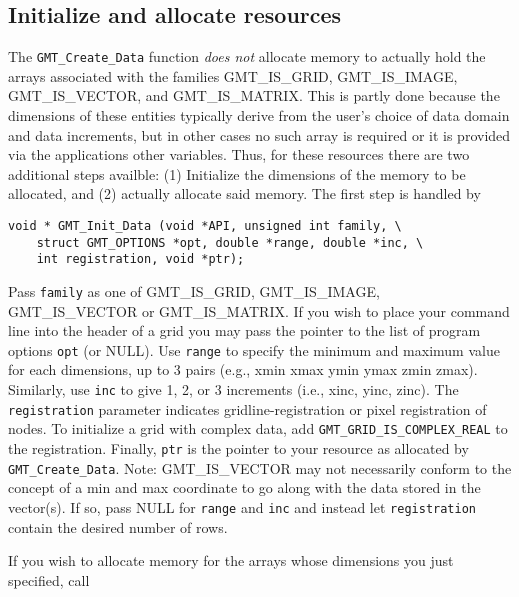 \documentclass[11pt]{report}
\begin{document}

\subsection{Initialize and allocate resources}

The \texttt{GMT\_Create\_Data} function \emph{does not} allocate memory to actually hold
the arrays associated with the families GMT\_IS\_GRID, GMT\_IS\_IMAGE, GMT\_IS\_VECTOR,
and GMT\_IS\_MATRIX.  This is partly done because the dimensions of these entities typically
derive from the user's choice of data domain and data increments, but in other cases no such
array is required or it is provided via the applications other variables.  Thus, for these
resources there are two additional steps availble: (1) Initialize the dimensions of the memory
to be allocated, and (2) actually allocate said memory.  The first step is handled by 


\begin{verbatim}
void * GMT_Init_Data (void *API, unsigned int family, \
    struct GMT_OPTIONS *opt, double *range, double *inc, \
    int registration, void *ptr);
\end{verbatim}
Pass \texttt{family} as one of GMT\_IS\_GRID, GMT\_IS\_IMAGE, GMT\_IS\_VECTOR or GMT\_IS\_MATRIX.
If you wish to place your command line into the header of a grid you may pass the pointer to the list
of program options \texttt{opt} (or NULL).  Use \texttt{range} to specify the minimum and maximum
value for each dimensions, up to 3 pairs (e.g., xmin xmax ymin ymax zmin zmax). Similarly, use
\texttt{inc} to give 1, 2, or 3 increments (i.e., xinc, yinc, zinc).  The
\texttt{registration} parameter indicates gridline-registration or pixel registration of nodes.
To initialize a grid with complex data, add \texttt{GMT\_GRID\_IS\_COMPLEX\_REAL} to the registration.
Finally, \texttt{ptr} is the pointer to your resource as allocated by \texttt{GMT\_Create\_Data}.
Note: GMT\_IS\_VECTOR may not necessarily conform to the concept of a min and max coordinate to go
along with the data stored in the vector(s).  If so, pass NULL for \texttt{range} and \texttt{inc}
and instead let \texttt{registration} contain the desired number of rows.

If you wish to allocate memory for the arrays whose dimensions you just specified, call
\end{document}
